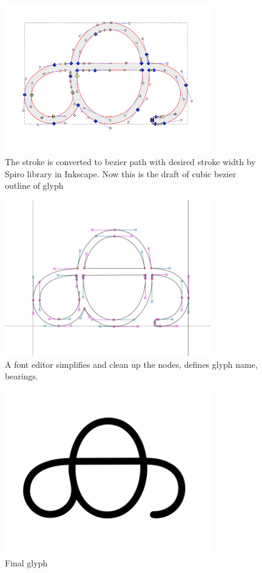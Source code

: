 \documentclass[11pt,twoside,a4paper,parskip=half]{scrartcl}
\begin{document}
\begin{figure}[h!]
	\includegraphics[width=0.8\textwidth]{images/design-2-stroke-to-path.png}
	\caption{The stroke is converted to bezier path with desired stroke width by Spiro library in Inkscape. Now this is the draft of cubic bezier outline of glyph}
	\label{design-2}
\end{figure}

\begin{figure}[h!]
	\includegraphics[width=0.8\textwidth]{images/design-3-cubic-bezier-in-font-editor.png}
	\caption{A font editor simplifies and clean up the nodes, defines glyph name, bearings.}
	\label{design-3}
\end{figure}
\clearpage
\begin{figure}[h!]
	\includegraphics[width=0.8\textwidth]{images/design-4-final.png}
	\caption{Final glyph}
	\label{design-4}
\end{figure}
\end{document}
